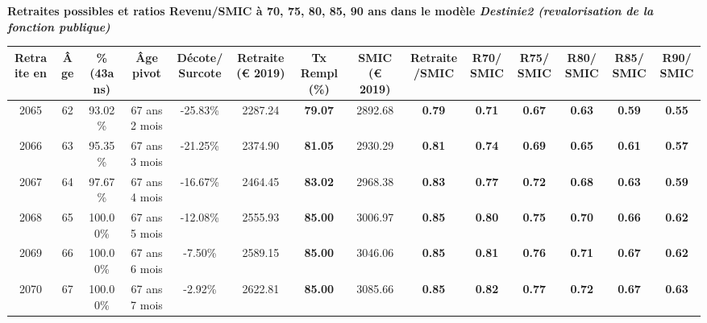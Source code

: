  \vspace{0.1cm} 
{\bf \noindent Retraites possibles et ratios Revenu/SMIC à 70, 75, 80, 85, 90 ans dans le modèle \emph{Destinie2 (revalorisation de la fonction publique)}}  
 
\begin{adjustbox}{max width=\textwidth} 
\begin{tabular}[htb]{|c|c||c|c|c||c|c||c|c||c|c|c|c|c|} 
\hline 
 Retraite en &  Âge &  \%(43ans) &  Âge pivot &  Décote/Surcote &  Retraite (\euro{} 2019) &  Tx Rempl(\%) &  SMIC (\euro{} 2019) &  Retraite/SMIC &  R70/SMIC &  R75/SMIC &  R80/SMIC &  R85/SMIC &  R90/SMIC \\ 
\hline \hline 
 2065 &  62 &  93.02\% &  67 ans 2 mois &  -25.83\% &  2287.24 &  {\bf 79.07} &  2892.68 &  {\bf {\color{red} 0.79}} &  {\bf {\color{red} 0.71}} &  {\bf {\color{red} 0.67}} &  {\bf {\color{red} 0.63}} &  {\bf {\color{red} 0.59}} &  {\bf {\color{red} 0.55}} \\ 
\hline 
 2066 &  63 &  95.35\% &  67 ans 3 mois &  -21.25\% &  2374.90 &  {\bf 81.05} &  2930.29 &  {\bf {\color{red} 0.81}} &  {\bf {\color{red} 0.74}} &  {\bf {\color{red} 0.69}} &  {\bf {\color{red} 0.65}} &  {\bf {\color{red} 0.61}} &  {\bf {\color{red} 0.57}} \\ 
\hline 
 2067 &  64 &  97.67\% &  67 ans 4 mois &  -16.67\% &  2464.45 &  {\bf 83.02} &  2968.38 &  {\bf {\color{red} 0.83}} &  {\bf {\color{red} 0.77}} &  {\bf {\color{red} 0.72}} &  {\bf {\color{red} 0.68}} &  {\bf {\color{red} 0.63}} &  {\bf {\color{red} 0.59}} \\ 
\hline 
 2068 &  65 &  100.00\% &  67 ans 5 mois &  -12.08\% &  2555.93 &  {\bf 85.00} &  3006.97 &  {\bf {\color{red} 0.85}} &  {\bf {\color{red} 0.80}} &  {\bf {\color{red} 0.75}} &  {\bf {\color{red} 0.70}} &  {\bf {\color{red} 0.66}} &  {\bf {\color{red} 0.62}} \\ 
\hline 
 2069 &  66 &  100.00\% &  67 ans 6 mois &  -7.50\% &  2589.15 &  {\bf 85.00} &  3046.06 &  {\bf {\color{red} 0.85}} &  {\bf {\color{red} 0.81}} &  {\bf {\color{red} 0.76}} &  {\bf {\color{red} 0.71}} &  {\bf {\color{red} 0.67}} &  {\bf {\color{red} 0.62}} \\ 
\hline 
 2070 &  67 &  100.00\% &  67 ans 7 mois &  -2.92\% &  2622.81 &  {\bf 85.00} &  3085.66 &  {\bf {\color{red} 0.85}} &  {\bf {\color{red} 0.82}} &  {\bf {\color{red} 0.77}} &  {\bf {\color{red} 0.72}} &  {\bf {\color{red} 0.67}} &  {\bf {\color{red} 0.63}} \\ 
\hline 
\hline 
\end{tabular} 
\end{adjustbox} 
 
